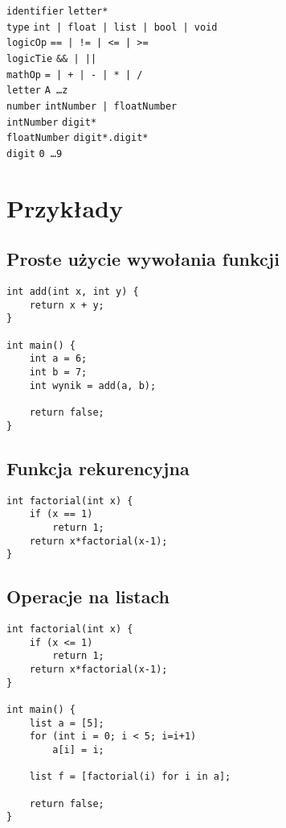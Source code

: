 \documentclass{article}
\newcommand{\keyword}[1]{\colorbox{light-gray}{\texttt{#1}}}
\newcommand{\code}[1]{\texttt{#1}}
\begin{document}
\code{identifier} \textrightarrow \code{letter*} \\
\code{type} \textrightarrow \code{\keyword{int} | \keyword{float} | \keyword{list} | \keyword{bool} | \keyword{void}} \\
\code{logicOp} \textrightarrow \code{\keyword{==} | \keyword{!=} | \keyword{<=} | \keyword{>=}} \\
\code{logicTie} \textrightarrow \code{\keyword{\&\&} | \keyword{||}} \\
\code{mathOp} \textrightarrow \code{\keyword{=} | \keyword{+} | \keyword{-} | \keyword{*} | \keyword{/}} \\
\code{letter} \textrightarrow \code{\keyword{A} \ldots \keyword{z}} \\
\code{number} \textrightarrow \code{intNumber | floatNumber} \\
\code{intNumber} \textrightarrow \code{digit*} \\
\code{floatNumber} \textrightarrow \code{digit*.digit*} \\
\code{digit} \textrightarrow \code{\keyword{0} \ldots \keyword{9}} \\

\newpage
\section{Przykłady}
\subsection{Proste użycie wywołania funkcji}
\begin{lstlisting}[tabsize=2]
int add(int x, int y) {
	return x + y;
}

int main() {
	int a = 6;
	int b = 7;
	int wynik = add(a, b);

	return false;
}
\end{lstlisting}

\subsection{Funkcja rekurencyjna}
\begin{lstlisting}[tabsize=2]
int factorial(int x) {
	if (x == 1)
		return 1;
	return x*factorial(x-1);
}
\end{lstlisting}

\subsection{Operacje na listach}
\begin{lstlisting}[tabsize=2]
int factorial(int x) {
	if (x <= 1)
		return 1;
	return x*factorial(x-1);
}

int main() {
	list a = [5];
	for (int i = 0; i < 5; i=i+1)
		a[i] = i;

	list f = [factorial(i) for i in a];

	return false;
}

\end{lstlisting}
\end{document}

